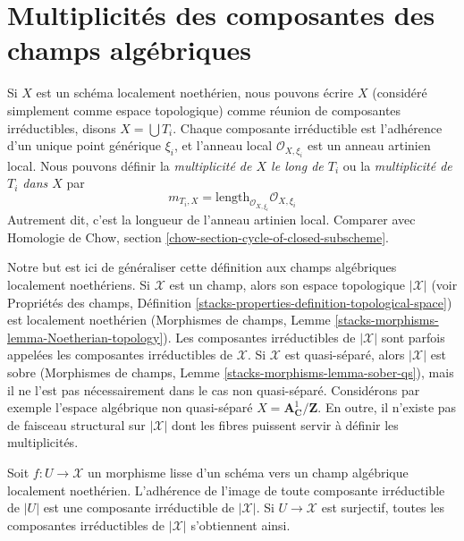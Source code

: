 \section{Multiplicités des composantes des champs algébriques}
\label{section-multiplicities}

\noindent
Si $X$ est un schéma localement noethérien, nous pouvons écrire $X$ (considéré
simplement comme espace topologique) comme réunion de composantes irréductibles,
disons $X = \bigcup T_i$. Chaque composante irréductible est l'adhérence d'un
unique point générique $\xi_i$, et l'anneau local $\mathcal O_{X,\xi_i}$
est un anneau artinien local. Nous pouvons définir la {\it multiplicité de $X$ le long de $T_i$}
ou la {\it multiplicité de $T_i$ dans $X$} par
$$
m_{T_i, X} = \text{length}_{\mathcal O_{X, \xi_i}} \mathcal O_{X, \xi_i}
$$
Autrement dit, c'est la longueur de l'anneau artinien local. Comparer
avec
Homologie de Chow, section \ref{chow-section-cycle-of-closed-subscheme}.

\medskip\noindent
Notre but est ici de généraliser cette définition aux champs algébriques
localement noethériens. Si $\mathcal{X}$ est un champ,
alors son espace topologique $|\mathcal{X}|$
(voir Propriétés des champs, Définition
\ref{stacks-properties-definition-topological-space})
est localement noethérien
(Morphismes de champs, Lemme \ref{stacks-morphisms-lemma-Noetherian-topology}).
Les composantes irréductibles de $|\mathcal{X}|$ sont parfois
appelées les composantes irréductibles de $\mathcal{X}$.
Si $\mathcal{X}$ est quasi-séparé, alors $|\mathcal{X}|$
est sobre (Morphismes de champs, Lemme
\ref{stacks-morphisms-lemma-sober-qs}),
mais il ne l'est pas nécessairement dans le cas
non quasi-séparé. Considérons par exemple l'espace algébrique non quasi-séparé
$X = \mathbf{A}^1_\mathbf{C}/\mathbf{Z}$.
En outre, il n'existe pas de faisceau structural
sur $|\mathcal{X}|$ dont les fibres puissent servir à définir les multiplicités.

\begin{lemma}
\label{lemma-map-of-components}
Soit $f : U \to \mathcal{X}$ un morphisme lisse d'un schéma
vers un champ algébrique localement noethérien. L'adhérence de l'image de toute
composante irréductible de $|U|$ est une composante irréductible de $|\mathcal{X}|$.
Si $U \to \mathcal{X}$ est surjectif, toutes les composantes irréductibles de
$|\mathcal{X}|$ s'obtiennent ainsi.
\end{lemma}

